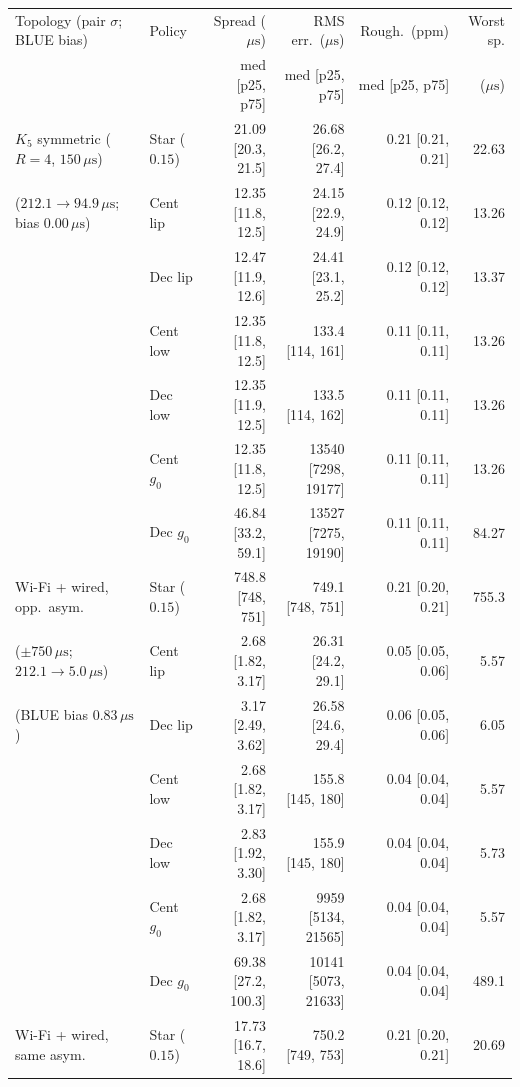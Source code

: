 \documentclass[11pt,a4paper]{article}
\theoremstyle{definition}
\begin{document}
\begin{table}[htb]
\centering
\scriptsize
\setlength{\tabcolsep}{3.0pt}
\begin{tabular}{@{}ll r r r r@{}}
\toprule
Topology (pair $\sigma$; BLUE bias) & Policy & Spread ($\mu\text{s}$) & RMS err.\ ($\mu\text{s}$) & Rough.\ (ppm) & Worst sp. \\
 & & med [p25, p75] & med [p25, p75] & med [p25, p75] & ($\mu\text{s}$) \\
\midrule
$K_5$ symmetric ($R{=}4$, $150\,\mu\text{s}$) & Star ($0.15$) & 21.09 [20.3, 21.5] & 26.68 [26.2, 27.4] & 0.21 [0.21, 0.21] & 22.63 \\
($212.1 \to 94.9\,\mu\text{s}$; bias $0.00\,\mu\text{s}$) & Cent lip & 12.35 [11.8, 12.5] & 24.15 [22.9, 24.9] & 0.12 [0.12, 0.12] & 13.26 \\
 & Dec lip  & 12.47 [11.9, 12.6] & 24.41 [23.1, 25.2] & 0.12 [0.12, 0.12] & 13.37 \\
 & Cent low & 12.35 [11.8, 12.5] & 133.4 [114, 161] & 0.11 [0.11, 0.11] & 13.26 \\
 & Dec low  & 12.35 [11.9, 12.5] & 133.5 [114, 162] & 0.11 [0.11, 0.11] & 13.26 \\
 & Cent $g_0$ & 12.35 [11.8, 12.5] & 13540 [7298, 19177] & 0.11 [0.11, 0.11] & 13.26 \\
 & Dec $g_0$  & 46.84 [33.2, 59.1] & 13527 [7275, 19190] & 0.11 [0.11, 0.11] & 84.27 \\
\midrule
Wi-Fi + wired, opp.\ asym. & Star ($0.15$) & 748.8 [748, 751] & 749.1 [748, 751] & 0.21 [0.20, 0.21] & 755.3 \\
($\pm 750\,\mu\text{s}$; $212.1 \to 5.0\,\mu\text{s}$) & Cent lip & 2.68 [1.82, 3.17] & 26.31 [24.2, 29.1] & 0.05 [0.05, 0.06] & 5.57 \\
(BLUE bias $0.83\,\mu\text{s}$) & Dec lip  & 3.17 [2.49, 3.62] & 26.58 [24.6, 29.4] & 0.06 [0.05, 0.06] & 6.05 \\
 & Cent low & 2.68 [1.82, 3.17] & 155.8 [145, 180] & 0.04 [0.04, 0.04] & 5.57 \\
 & Dec low  & 2.83 [1.92, 3.30] & 155.9 [145, 180] & 0.04 [0.04, 0.04] & 5.73 \\
 & Cent $g_0$ & 2.68 [1.82, 3.17] & 9959 [5134, 21565] & 0.04 [0.04, 0.04] & 5.57 \\
 & Dec $g_0$  & 69.38 [27.2, 100.3] & 10141 [5073, 21633] & 0.04 [0.04, 0.04] & 489.1 \\
\midrule
Wi-Fi + wired, same asym. & Star ($0.15$) & 17.73 [16.7, 18.6] & 750.2 [749, 753] & 0.21 [0.20, 0.21] & 20.69 \\

\end{tabular}
\end{table}
\end{document}
